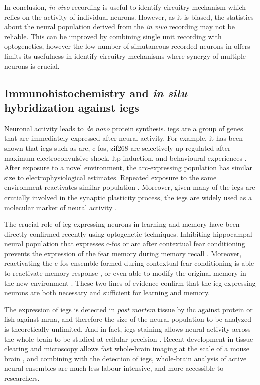 In conclusion, \textit{in vivo} recording is useful to identify circuitry mechanism which relies on the activity of individual neurons. However, as it is biased, the statistics about the neural population derived from the \textit{in vivo} recording may not be reliable. This can be improved by combining single unit recording with optogenetics, however the low number of simutaneous recorded neurons in offers limits its usefulness in identify circuitry mechanisms where synergy of multiple neurons is crucial. 

\subsection{Immunohistochemistry and \textit{in situ} hybridization against \glspl{ieg}}
Neuronal activity leads to \textit{de novo} protein synthesis. \Glspl{ieg} are a group of genes that are immediately expressed after neural activity. For example, it has been shown that \glspl{ieg} such as \gls{arc}, c-fos, zif268 are selectively up-regulated after maximum electroconvulsive shock, \gls{ltp} induction, and behavioural experiences \citep{guzowski99, vann00, hall01}. After exposure to a novel environment, the \gls{arc}-expressing population has similar size to electrophysiological estimates. Repeated exposure to the same environment reactivates similar population \citep{guzowski06, niibori12}. Moreover, given many of the \glspl{ieg} are crutially involved in the synaptic plasticity process, the \glspl{ieg} are widely used as a molecular marker of neural activity \citep{minatohara15}. 

The crucial role of \gls{ieg}-expressing neurons in learning and memory have been directly confirmed recently using optogenetic techniques. Inhibiting hippocampal neural population that expresses c-fos or \gls{arc} after contextual fear conditioning prevents the expression of the fear memory during memory recall \citep{denny14, tanaka14}. Moreover, reactivating the c-fos ensemble formed during contextual fear conditioning is able to reactivate memory response \citep{liu12, cowansage14, ohkawa15}, or even able to modify the original memory in the new environment \citep{ramirez13, redondo14}. These two lines of evidence confirm that the \gls{ieg}-expressing neurons are both necessary and sufficient for learning and memory. 

The expression of \glspl{ieg} is detected in \textit{post mortem} tissue by \gls{ihc} against protein or \gls{fish} against \gls{mrna}, and therefore the size of the neural population to be analyzed is theoretically unlimited. And in fact, \glspl{ieg} staining allows neural activity across the whole-brain to be studied at cellular precision \citep{wheeler13}. Recent development in tissue clearing and microscopy allows fast whole-brain imaging at the scale of a mouse brain , and combining with the detection of \glspl{ieg}, whole-brain analysis of active neural ensembles are much less labour intensive, and more accessible to researchers.   

